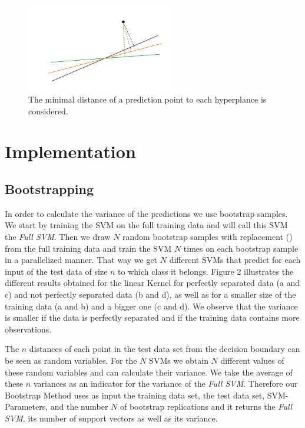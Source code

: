 \documentclass[a4paper]{article}
\begin{document}
\begin{figure}[!htb]
\begin{center}
\includegraphics[width=2.5in]{abb/distances.jpg}
\caption{The minimal distance of a prediction point to each hyperplance is considered.}
\label{fig1}
\end{center}
\end{figure}




\section{Implementation}

\subsection{Bootstrapping}
In order to calculate the variance of the predictions we use bootstrap samples. We start by training the SVM on the full training data and will call this SVM the \textit{Full SVM}. Then we draw $N$ random bootstrap samples with replacement (\cite{christmann_bootstrap_2013}) from the full training data and train the SVM $N$ times on each bootstrap sample in a parallelized manner. That way we get $N$ different SVMs that predict for each input of the test data of size $n$ to which class it belongs. Figure 2 \label{fig2} illustrates the different results obtained for the linear Kernel for perfectly separated data (a and c) and not perfectly separated data (b and d), as well as for a smaller size of the training data (a and b) and a bigger one (c and d). We observe that the variance is smaller if the data is perfectly separated and if the training data contains more observations.

The $n$ distances of each point in the test data set from the decision boundary can be seen as random variables. For the $N$ SVMs we obtain $N$ different values of these random variables and can calculate their variance. We take the average of these $n$ variances as an indicator for the variance of the \textit{Full SVM}. Therefore our Bootstrap Method uses as input the training data set, the test data set, SVM-Parameters, and the number $N$ of bootstrap replications and it returns the \textit{Full SVM}, its number of support vectors as well as its variance.
\end{document}
